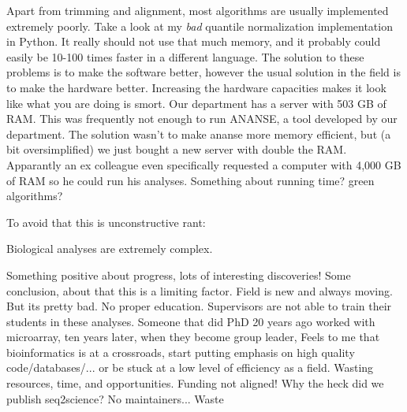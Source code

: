 Apart from trimming and alignment, most algorithms are usually implemented extremely poorly. Take a look at my \textit{bad} quantile normalization implementation in Python. It really should not use that much memory, and it probably could easily be 10-100 times faster in a different language. The solution to these problems is to make the software better, however the usual solution in the field is to make the hardware better. Increasing the hardware capacities makes it look like what you are doing is smort. Our department has a server with 503 GB of RAM. This was frequently not enough to run ANANSE, a tool developed by our department. The solution wasn't to make ananse more memory efficient, but (a bit oversimplified) we just bought a new server with double the RAM. Apparantly an ex colleague even specifically requested a computer with 4,000 GB of RAM so he could run his analyses. 
Something about running time? green algorithms? 

To avoid that this is unconstructive rant:

Biological analyses are extremely complex. 

Something positive about progress, lots of interesting discoveries! 
Some conclusion, about that this is a limiting factor. Field is new and always moving. But its pretty bad. No proper education. Supervisors are not able to train their students in these analyses. Someone that did PhD 20 years ago worked with microarray, ten years later, when they become group leader, 
Feels to me that bioinformatics is at a crossroads, start putting emphasis on high quality code/databases/... or be stuck at a low level of efficiency as a field. Wasting resources, time, and opportunities.
Funding not aligned!
Why the heck did we publish seq2science? No maintainers... Waste





